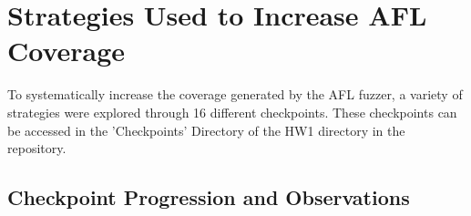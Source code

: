 \documentclass[conference]{IEEEtran}
\begin{document}


\section{Strategies Used to Increase AFL Coverage}

To systematically increase the coverage generated by the AFL fuzzer, a variety of strategies were explored through 16 different checkpoints. These checkpoints can be accessed in the 'Checkpoints' Directory of the HW1 directory in the repository.

\subsection{Checkpoint Progression and Observations}
\end{document}
